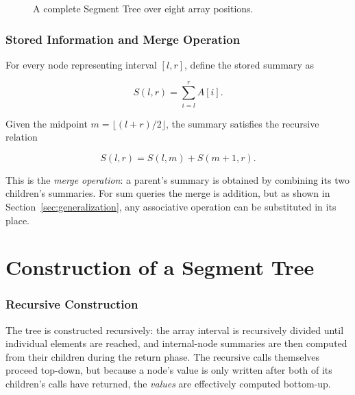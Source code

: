 \documentclass[11pt,open=any]{scrreprt}
\begin{document}
\begin{figure}[H]
\caption{A complete Segment Tree over eight array positions.}
\label{fig:segment-tree-structure}
\end{figure}

\subsection{Stored Information and Merge Operation}
For every node representing interval $[l,r]$, define the stored summary as

\begin{equation}
S(l,r) = \sum_{i=l}^{r} A[i].
\end{equation}

Given the midpoint $m = \lfloor (l+r)/2 \rfloor$, the summary satisfies the recursive relation

\begin{equation}
S(l,r) = S(l,m) + S(m+1,r).
\label{eq:merge}
\end{equation}

This is the \emph{merge operation}: a parent's summary is obtained by combining its two children's summaries. For sum queries the merge is addition, but as shown in Section~\ref{sec:generalization}, any associative operation can be substituted in its place.

\chapter{Construction of a Segment Tree}

\subsection{Recursive Construction}
The tree is constructed recursively: the array interval is recursively divided until individual elements are reached, and internal-node summaries are then computed from their children during the return phase. The recursive calls themselves proceed top-down, but because a node's value is only written after both of its children's calls have returned, the \emph{values} are effectively computed bottom-up.
\end{document}
